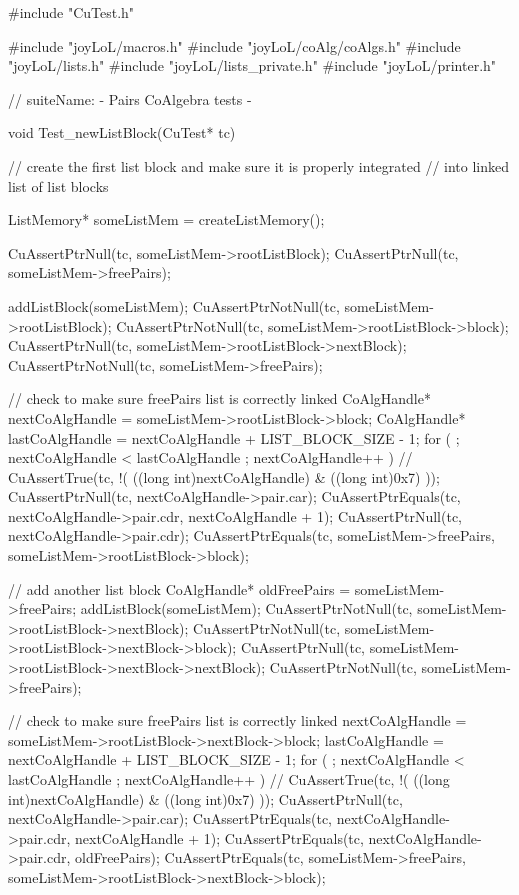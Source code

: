 #include "CuTest.h"

#include "joyLoL/macros.h"
#include "joyLoL/coAlg/coAlgs.h"
#include "joyLoL/lists.h"
#include "joyLoL/lists_private.h"
#include "joyLoL/printer.h"

// suiteName: - Pairs CoAlgebra tests -

void Test_newListBlock(CuTest* tc) {
  // create the first list block and make sure it is properly integrated
  // into linked list of list blocks

  ListMemory* someListMem = createListMemory();

  CuAssertPtrNull(tc, someListMem->rootListBlock);
  CuAssertPtrNull(tc, someListMem->freePairs);

  addListBlock(someListMem);
  CuAssertPtrNotNull(tc, someListMem->rootListBlock);
  CuAssertPtrNotNull(tc, someListMem->rootListBlock->block);
  CuAssertPtrNull(tc, someListMem->rootListBlock->nextBlock);
  CuAssertPtrNotNull(tc, someListMem->freePairs);

  // check to make sure freePairs list is correctly linked
  CoAlgHandle* nextCoAlgHandle = someListMem->rootListBlock->block;
  CoAlgHandle* lastCoAlgHandle = nextCoAlgHandle + LIST_BLOCK_SIZE - 1;
  for ( ; nextCoAlgHandle < lastCoAlgHandle ; nextCoAlgHandle++ ) {
//    CuAssertTrue(tc, !( ((long int)nextCoAlgHandle) & ((long int)0x7) ));
    CuAssertPtrNull(tc, nextCoAlgHandle->pair.car);
    CuAssertPtrEquals(tc, nextCoAlgHandle->pair.cdr, nextCoAlgHandle + 1);
  }
  CuAssertPtrNull(tc, nextCoAlgHandle->pair.cdr);
  CuAssertPtrEquals(tc, someListMem->freePairs, someListMem->rootListBlock->block);

  // add another list block
  CoAlgHandle* oldFreePairs = someListMem->freePairs;
  addListBlock(someListMem);
  CuAssertPtrNotNull(tc, someListMem->rootListBlock->nextBlock);
  CuAssertPtrNotNull(tc, someListMem->rootListBlock->nextBlock->block);
  CuAssertPtrNull(tc, someListMem->rootListBlock->nextBlock->nextBlock);
  CuAssertPtrNotNull(tc, someListMem->freePairs);

  // check to make sure freePairs list is correctly linked
  nextCoAlgHandle = someListMem->rootListBlock->nextBlock->block;
  lastCoAlgHandle = nextCoAlgHandle + LIST_BLOCK_SIZE - 1;
  for ( ; nextCoAlgHandle < lastCoAlgHandle ; nextCoAlgHandle++ ) {
//    CuAssertTrue(tc, !( ((long int)nextCoAlgHandle) & ((long int)0x7) ));
    CuAssertPtrNull(tc, nextCoAlgHandle->pair.car);
    CuAssertPtrEquals(tc, nextCoAlgHandle->pair.cdr, nextCoAlgHandle + 1);
  }
  CuAssertPtrEquals(tc, nextCoAlgHandle->pair.cdr, oldFreePairs);
  CuAssertPtrEquals(tc, someListMem->freePairs, someListMem->rootListBlock->nextBlock->block);
}

